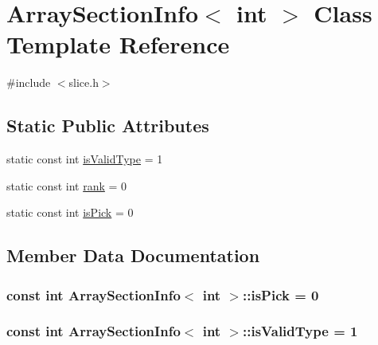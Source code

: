 \hypertarget{classArraySectionInfo_3_01int_01_4}{}\section{Array\+Section\+Info$<$ int $>$ Class Template Reference}
\label{classArraySectionInfo_3_01int_01_4}


{\ttfamily \#include $<$slice.\+h$>$}

\subsection*{Static Public Attributes}
\begin{DoxyCompactItemize}
\item 
static const int \hyperlink{classArraySectionInfo_3_01int_01_4_af721dcae4e4c91e37cf482b852cf249d}{is\+Valid\+Type} = 1
\item 
static const int \hyperlink{classArraySectionInfo_3_01int_01_4_a2f5850b154908dcae6a09d2eed13f322}{rank} = 0
\item 
static const int \hyperlink{classArraySectionInfo_3_01int_01_4_a46056960f44beae2d0e6e7ae9b0ef955}{is\+Pick} = 0
\end{DoxyCompactItemize}


\subsection{Member Data Documentation}
\hypertarget{classArraySectionInfo_3_01int_01_4_a46056960f44beae2d0e6e7ae9b0ef955}{}
\subsubsection[{is\+Pick}]{\setlength{\rightskip}{0pt plus 5cm}const int {\bf Array\+Section\+Info}$<$ int $>$\+::is\+Pick = 0\hspace{0.3cm}{\ttfamily [static]}}\label{classArraySectionInfo_3_01int_01_4_a46056960f44beae2d0e6e7ae9b0ef955}
\hypertarget{classArraySectionInfo_3_01int_01_4_af721dcae4e4c91e37cf482b852cf249d}{}
\subsubsection[{is\+Valid\+Type}]{\setlength{\rightskip}{0pt plus 5cm}const int {\bf Array\+Section\+Info}$<$ int $>$\+::is\+Valid\+Type = 1\hspace{0.3cm}{\ttfamily [static]}}\label{classArraySectionInfo_3_01int_01_4_af721dcae4e4c91e37cf482b852cf249d}
\hypertarget{classArraySectionInfo_3_01int_01_4_a2f5850b154908dcae6a09d2eed13f322}{}
